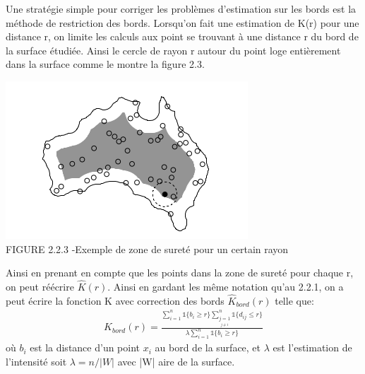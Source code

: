 \documentclass[french,12pt,a4paper]{report}
\begin{document}
Une stratégie simple pour corriger les problèmes d'estimation sur les bords est la méthode de restriction des bords. Lorsqu'on fait une estimation de K(r) pour une distance r, on limite les calculs aux point se trouvant à une distance r du bord de la surface étudiée. Ainsi le cercle de rayon r autour du point loge entièrement dans la surface comme le montre la figure 2.3.

\begin{center}
\includegraphics[scale=0.7]{images/bords.png}\\
\small{FIGURE 2.2.3 -Exemple de zone de sureté pour un certain rayon}\\
\end{center}

Ainsi en prenant en compte que les points dans la zone de sureté pour chaque r, on peut réécrire \begin{math} \hat{K}(r) \end{math}. Ainsi en gardant les même notation qu'au 2.2.1, on a peut écrire la fonction K avec correction des bords \begin{math} \hat{K}_{bord}(r) \end{math} telle que:
\begin{align*}
\hat{K}_{bord}(r) = \frac{  \sum_{i=1}^n \mathds{1} \{b_i \geq r \} \sum_{\underset{j \neq i}{j=1}}^n \mathds{1} \{d_{ij} \leq r \}}{\lambda \sum_{i=1}^n \mathds{1} \{b_i \geq r \}}
\end{align*}
où \begin{math}b_i\end{math} est la distance d'un point \begin{math}x_i\end{math} au bord de la surface, et \begin{math}\lambda\end{math} est l'estimation de l'intensité soit \begin{math}\lambda = n/|W|\end{math} avec |W| aire de la surface.
\end{document}
